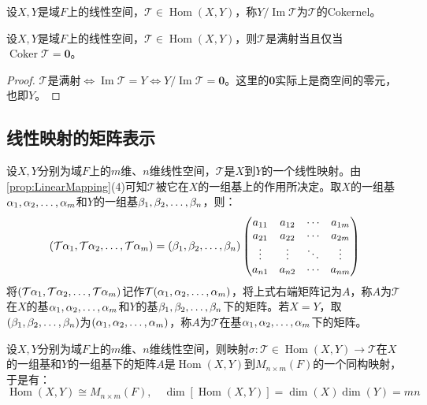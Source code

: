 \begin{definition}
	设$X,Y$是域$F$上的线性空间，$\mathcal{T}\in\operatorname{Hom}(X,Y)$，称$Y/\operatorname{Im}\mathcal{T}$为$\mathcal{T}$的\gls{Cokernel}。
\end{definition}
\begin{theorem}
	设$X,Y$是域$F$上的线性空间，$\mathcal{T}\in\operatorname{Hom}(X,Y)$，则$\mathcal{T}$是满射当且仅当$\operatorname{Coker}\mathcal{T}=\mathbf{0}$。
\end{theorem}
\begin{proof}
	$\mathcal{T}$是满射$\iff\operatorname{Im}\mathcal{T}=Y\iff Y/\operatorname{Im}\mathcal{T}=\mathbf{0}$。这里的$\mathbf{0}$实际上是商空间的零元，也即$Y$。
\end{proof}

\subsection{线性映射的矩阵表示}
\begin{definition}
	设$X,Y$分别为域$F$上的$m$维、$n$维线性空间，$\mathcal{T}$是$X$到$Y$的一个线性映射。由\cref{prop:LinearMapping}(4)可知$\mathcal{T}$被它在$X$的一组基上的作用所决定。取$X$的一组基$\alpha_1, \alpha_2, \dots, \alpha_{m}$和$Y$的一组基$\beta_1, \beta_2, \dots, \beta_{n}$，则：
	\begin{equation*}
		(\mathcal{T}\alpha_1, \mathcal{T}\alpha_2, \dots, \mathcal{T}\alpha_{m})=(\beta_1, \beta_2, \dots, \beta_{n})
		\begin{pmatrix}
			a_{11} & a_{12} & \cdots & a_{1m} \\
			a_{21} & a_{22} & \cdots & a_{2m} \\
			\vdots & \vdots & \ddots & \vdots \\
			a_{n1} & a_{n2} & \cdots & a_{nm} \\
		\end{pmatrix}
	\end{equation*}
	将$(\mathcal{T}\alpha_1, \mathcal{T}\alpha_2, \dots, \mathcal{T}\alpha_{m})$记作$\mathcal{T}(\alpha_1, \alpha_2, \dots, \alpha_{m})$，将上式右端矩阵记为$A$，称$A$为$\mathcal{T}$在$X$的基$\alpha_1, \alpha_2, \dots, \alpha_{m}$和$Y$的基$\beta_1, \beta_2, \dots, \beta_{n}$下的矩阵。若$X=Y$，取$(\beta_1, \beta_2, \dots, \beta_{n})$为$(\alpha_1, \alpha_2, \dots, \alpha_{m})$，称$A$为$\mathcal{T}$在基$\alpha_1, \alpha_2, \dots, \alpha_{m}$下的矩阵。
\end{definition}
\begin{theorem}\label{theo:LinearTransformationMatrix}
	设$X,Y$分别为域$F$上的$m$维、$n$维线性空间，则映射$\sigma:\mathcal{T}\in\operatorname{Hom}(X,Y)\longrightarrow\mathcal{T}$在$X$的一组基和$Y$的一组基下的矩阵$A$是$\operatorname{Hom}(X,Y)$到$M_{n\times m}(F)$的一个同构映射，于是有：
	\begin{equation*}
		\operatorname{Hom}(X,Y)\cong M_{n\times m}(F),\quad\dim[\operatorname{Hom}(X,Y)]=\dim(X)\dim(Y)=mn
	\end{equation*}
\end{theorem}
